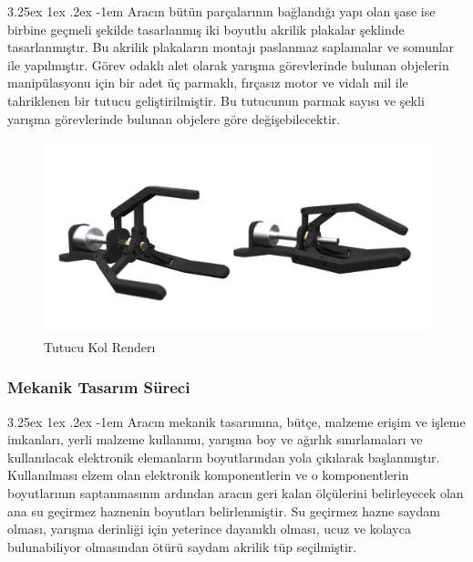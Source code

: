 \documentclass[12pt]{article}
\makeatletter
\renewcommand\paragraph{\@startsection{paragraph}{5}{\z@}%
  {3.25ex \@plus1ex \@minus.2ex}%
  {-1em}%
  {\normalfont\normalsize\bfseries}}
\makeatother
\begin{document}
\newpage

\paragraph{} Aracın bütün parçalarının bağlandığı yapı olan şase ise birbine geçmeli şekilde tasarlanmış iki boyutlu akrilik plakalar şeklinde tasarlanmıştır. Bu akrilik plakaların montajı paslanmaz saplamalar ve somunlar ile yapılmıştır. Görev odaklı alet olarak yarışma görevlerinde bulunan objelerin manipülasyonu için bir adet üç parmaklı, fırçasız motor ve vidalı mil ile tahriklenen bir tutucu geliştirilmiştir. Bu tutucunun parmak sayısı ve şekli yarışma görevlerinde bulunan objelere göre değişebilecektir. 


\begin{figure}[hbt!]
\centering
\includegraphics[width=1\textwidth]{images/gripper_render.png}
\caption{Tutucu Kol Renderı}
\label{fig:gripper}
\end{figure}

\subsubsection{Mekanik Tasarım Süreci}

\paragraph{} Aracın mekanik tasarımına, bütçe, malzeme erişim  ve işleme imkanları, yerli malzeme kullanımı, yarışma boy ve ağırlık sınırlamaları ve kullanılacak elektronik elemanların boyutlarından yola çıkılarak başlanmıştır. Kullanılması elzem olan elektronik komponentlerin ve o komponentlerin boyutlarının saptanmasının ardından aracın geri kalan ölçülerini belirleyecek olan ana su geçirmez haznenin boyutları belirlenmiştir. Su geçirmez hazne saydam olması, yarışma derinliği için yeterince dayanıklı olması, ucuz ve kolayca bulunabiliyor olmasından ötürü saydam akrilik tüp seçilmiştir.
\end{document}
